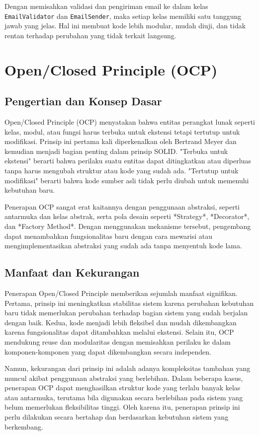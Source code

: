 Dengan memisahkan validasi dan pengiriman email ke dalam kelas \texttt{EmailValidator} dan \texttt{EmailSender}, maka setiap kelas memiliki satu tanggung jawab yang jelas. Hal ini membuat kode lebih modular, mudah diuji, dan tidak rentan terhadap perubahan yang tidak terkait langsung.

\section{Open/Closed Principle (OCP)}

\subsection{Pengertian dan Konsep Dasar}
Open/Closed Principle (OCP) menyatakan bahwa entitas perangkat lunak seperti kelas, modul, atau fungsi harus terbuka untuk ekstensi tetapi tertutup untuk modifikasi. Prinsip ini pertama kali diperkenalkan oleh Bertrand Meyer dan kemudian menjadi bagian penting dalam prinsip SOLID. "Terbuka untuk ekstensi" berarti bahwa perilaku suatu entitas dapat ditingkatkan atau diperluas tanpa harus mengubah struktur atau kode yang sudah ada. "Tertutup untuk modifikasi" berarti bahwa kode sumber asli tidak perlu diubah untuk memenuhi kebutuhan baru.

Penerapan OCP sangat erat kaitannya dengan penggunaan abstraksi, seperti antarmuka dan kelas abstrak, serta pola desain seperti *Strategy*, *Decorator*, dan *Factory Method*. Dengan menggunakan mekanisme tersebut, pengembang dapat menambahkan fungsionalitas baru dengan cara mewarisi atau mengimplementasikan abstraksi yang sudah ada tanpa menyentuh kode lama.

\subsection{Manfaat dan Kekurangan}
Penerapan Open/Closed Principle memberikan sejumlah manfaat signifikan. Pertama, prinsip ini meningkatkan stabilitas sistem karena perubahan kebutuhan baru tidak memerlukan perubahan terhadap bagian sistem yang sudah berjalan dengan baik. Kedua, kode menjadi lebih fleksibel dan mudah dikembangkan karena fungsionalitas dapat ditambahkan melalui ekstensi. Selain itu, OCP mendukung reuse dan modularitas dengan memisahkan perilaku ke dalam komponen-komponen yang dapat dikembangkan secara independen.

Namun, kekurangan dari prinsip ini adalah adanya kompleksitas tambahan yang muncul akibat penggunaan abstraksi yang berlebihan. Dalam beberapa kasus, penerapan OCP dapat menghasilkan struktur kode yang terlalu banyak kelas atau antarmuka, terutama bila digunakan secara berlebihan pada sistem yang belum memerlukan fleksibilitas tinggi. Oleh karena itu, penerapan prinsip ini perlu dilakukan secara bertahap dan berdasarkan kebutuhan sistem yang berkembang.

